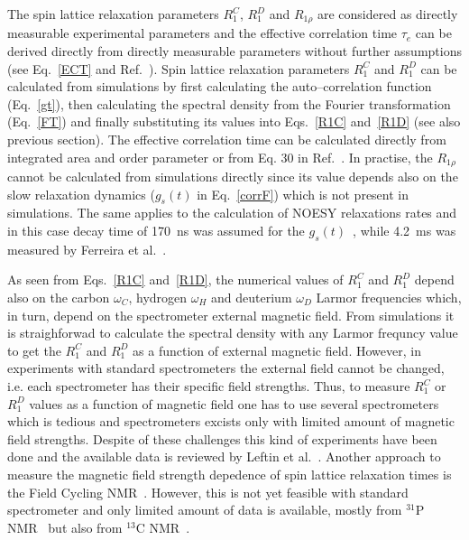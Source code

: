 \documentclass[aps,prl,superscriptaddress,twocolumn]{revtex4}
\begin{document}
The spin lattice relaxation parameters $R_1^{C}$, $R_1^{D}$ and $R_{1\rho}$ are considered as
directly measurable experimental parameters and the effective correlation time $\tau_e$ can be derived directly
from directly measurable parameters without further assumptions (see Eq.~\ref{ECT} and Ref.~\cite{ferreira15}).
Spin lattice relaxation parameters $R_1^{C}$ and $R_1^{D}$ can be calculated from simulations
by first calculating the auto--correlation function (Eq.~\ref{gt}), then calculating the spectral
density from the Fourier transformation (Eq.~\ref{FT}) and finally substituting its values into
Eqs.~\ref{R1C} and~\ref{R1D} (see also previous section). The effective correlation time can be calculated
directly from integrated area and order parameter or from Eq. 30 in Ref.~\cite{ferreira15}.
In practise, the $R_{1\rho}$ cannot be calculated from simulations directly since its value depends
also on the slow relaxation dynamics ($g_s(t)$ in Eq.~\ref{corrF}) which is not present in simulations.
The same applies to the calculation of NOESY relaxations rates and in this case decay time of 170~ns was assumed for the
$g_s(t)$~\cite{feller99}, while 4.2~ms was measured by Ferreira et al.~\cite{ferreira15}.

As seen from Eqs.~\ref{R1C} and~\ref{R1D}, the numerical values of $R_1^{C}$ and $R_1^{D}$ depend also on the carbon $\omega_C$, hydrogen $\omega_H$ and
deuterium $\omega_D$ Larmor frequencies which, in turn, depend on the spectrometer external magnetic field.
From simulations it is straighforwad to calculate the spectral density with any Larmor frequncy value to get
the $R_1^{C}$ and $R_1^{D}$ as a function of external magnetic field.
However, in experiments with standard spectrometers the external field cannot be changed, i.e. each 
spectrometer has their specific field strengths. Thus, to measure $R_1^{C}$ or $R_1^{D}$ values as
a function of magnetic field one has to use several spectrometers which is tedious and spectrometers
excists only with limited amount of magnetic field strengths. Despite of these challenges this kind 
of experiments have been done and the available data is reviewed by Leftin et al.~\cite{leftin11}.
Another approach to measure the magnetic field strength depedence of spin lattice relaxation times
is the Field Cycling NMR~\cite{roberts04a,roberts04b}. However, this is not yet feasible with standard spectrometer
and only limited amount of data is available, mostly from $^{31}$P NMR~\cite{roberts04a,roberts04b,roberts09}
but also from $^{13}$C NMR~\cite{sivanandam09}.
\end{document}
